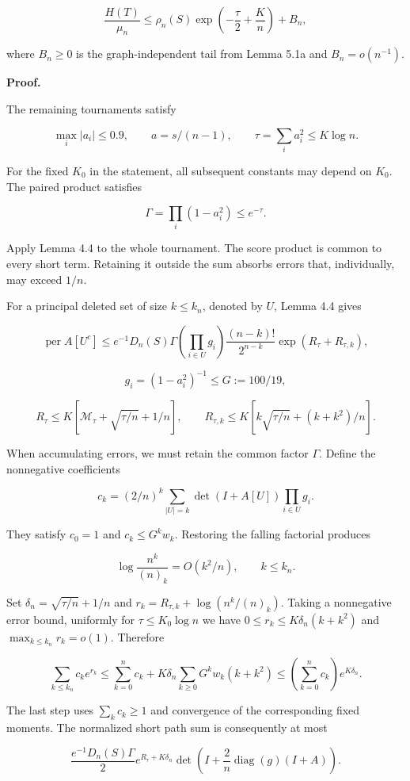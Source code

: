 \documentclass[11pt,a4paper]{article}
\begin{document}
\[
\frac{H(T)}{\mu_n}\le\rho_n(S)\exp\left(-\frac\tau2+\frac K n\right)+B_n,
\]

where \(B_n\ge0\) is the graph-independent tail from Lemma 5.1a and \(B_n=o(n^{-1})\).

\textbf{Proof.}

The remaining tournaments satisfy

\[
\max_i|a_i|\le0.9,\qquad
a=s/(n-1),\qquad \tau=\sum_i a_i^2\le K\log n.
\]

For the fixed \(K_0\) in the statement, all subsequent constants may depend on \(K_0\). The paired product satisfies

\[
\Gamma=\prod_i(1-a_i^2)\le e^{-\tau}.
\]

Apply Lemma 4.4 to the whole tournament. The score product is common to every short term. Retaining it outside the sum absorbs errors that, individually, may exceed \(1/n\).

For a principal deleted set of size \(k\le k_n\), denoted by \(U\), Lemma 4.4 gives

\[
\operatorname{per}A[U^c]\le
e^{-1}D_n(S)\Gamma
\left(\prod_{i\in U}g_i\right)
\frac{(n-k)!}{2^{n-k}}\exp(R_\tau+R_{\tau,k}),
\]

\[
g_i=(1-a_i^2)^{-1}\le G:=100/19,
\]

\[
R_\tau\le K[\mathcal M_\tau+\sqrt{\tau/n}+1/n],\qquad
R_{\tau,k}\le K[k\sqrt{\tau/n}+(k+k^2)/n].
\]

When accumulating errors, we must retain the common factor \(\Gamma\). Define the nonnegative coefficients

\[
c_k=(2/n)^k\sum_{|U|=k}\det(I+A[U])\prod_{i\in U}g_i.
\]

They satisfy \(c_0=1\) and \(c_k\le G^kw_k\). Restoring the falling factorial produces

\[
\log\frac{n^k}{(n)_k}=O(k^2/n),\qquad k\le k_n.
\]

Set \(\delta_n=\sqrt{\tau/n}+1/n\) and \(r_k=R_{\tau,k}+\log(n^k/(n)_k)\). Taking a nonnegative error bound, uniformly for \(\tau\le K_0\log n\) we have \(0\le r_k\le K\delta_n(k+k^2)\) and \(\max_{k\le k_n}r_k=o(1)\). Therefore

\[
\sum_{k\le k_n}c_ke^{r_k}
\le\sum_{k=0}^{n}c_k+
K\delta_n\sum_{k\ge0}G^kw_k(k+k^2)
\le\left(\sum_{k=0}^{n}c_k\right)e^{K\delta_n}.
\]

The last step uses \(\sum_kc_k\ge1\) and convergence of the corresponding fixed moments. The normalized short path sum is consequently at most

\[
\frac{e^{-1}D_n(S)\Gamma}{2}
e^{R_\tau+K\delta_n}
\det\left(I+\frac2n\operatorname{diag}(g)(I+A)\right).
\]
\end{document}
